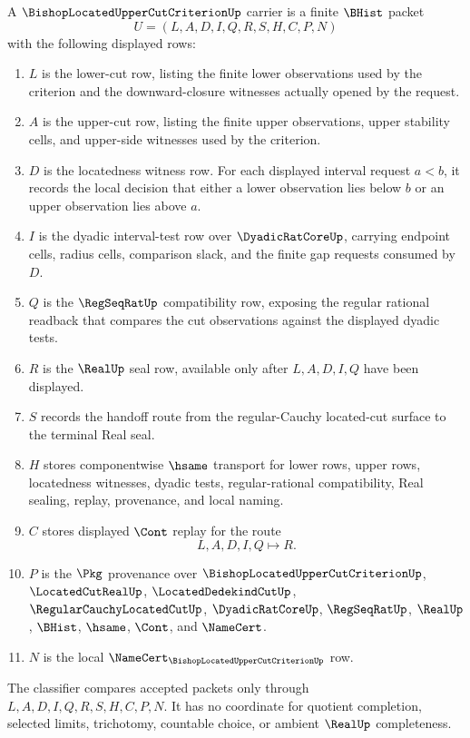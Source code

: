 \begin{definition}
\label{def:bishop-located-upper-cut-criterion-carrier}
A $\BishopLocatedUpperCutCriterionUp$ carrier is a finite $\BHist$ packet
$$
U=(L,A,D,I,Q,R,S,H,C,P,N)
$$
with the following displayed rows:
\begin{enumerate}
\item $L$ is the lower-cut row, listing the finite lower observations used by the criterion and the downward-closure witnesses actually opened by the request.
\item $A$ is the upper-cut row, listing the finite upper observations, upper stability cells, and upper-side witnesses used by the criterion.
\item $D$ is the locatedness witness row. For each displayed interval request $a<b$, it records the local decision that either a lower observation lies below $b$ or an upper observation lies above $a$.
\item $I$ is the dyadic interval-test row over $\DyadicRatCoreUp$, carrying endpoint cells, radius cells, comparison slack, and the finite gap requests consumed by $D$.
\item $Q$ is the $\RegSeqRatUp$ compatibility row, exposing the regular rational readback that compares the cut observations against the displayed dyadic tests.
\item $R$ is the $\RealUp$ seal row, available only after $L,A,D,I,Q$ have been displayed.
\item $S$ records the handoff route from the regular-Cauchy located-cut surface to the terminal Real seal.
\item $H$ stores componentwise $\hsame$ transport for lower rows, upper rows, locatedness witnesses, dyadic tests, regular-rational compatibility, Real sealing, replay, provenance, and local naming.
\item $C$ stores displayed $\Cont$ replay for the route
$$
L,A,D,I,Q \longmapsto R .
$$
\item $P$ is the $\Pkg$ provenance over $\BishopLocatedUpperCutCriterionUp$, $\LocatedCutRealUp$, $\LocatedDedekindCutUp$, $\RegularCauchyLocatedCutUp$, $\DyadicRatCoreUp$, $\RegSeqRatUp$, $\RealUp$, $\BHist$, $\hsame$, $\Cont$, and $\NameCert$.
\item $N$ is the local $\NameCert_{\BishopLocatedUpperCutCriterionUp}$ row.
\end{enumerate}
The classifier compares accepted packets only through $L,A,D,I,Q,R,S,H,C,P,N$. It has no coordinate for quotient completion, selected limits, trichotomy, countable choice, or ambient $\RealUp$ completeness.
\end{definition}

